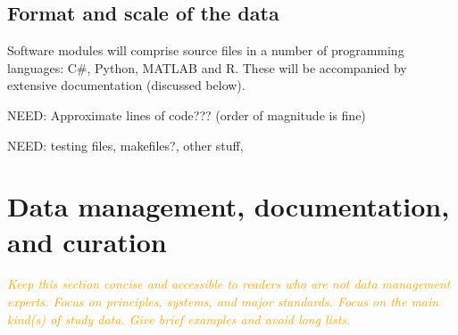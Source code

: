 \documentclass[a4paper,11pt]{article}
\renewcommand{\footnote}[1]{ [#1]}
\begin{document}

\subsection{Format and scale of the data}


Software modules will comprise source files in a number of programming languages: C\#, Python, MATLAB and R.  These will be accompanied by extensive documentation (discussed below).

NEED: Approximate lines of code??? (order of magnitude is fine)

NEED: testing files, makefiles?, other stuff, 



\section{Data management, documentation, and curation}

\textcolor{orange}{\textit{Keep this section concise and accessible to readers who are not data management experts.  Focus on principles, systems, and major standards. Focus on the main kind(s) of study data.  Give brief examples and avoid long lists.}}
\end{document}
